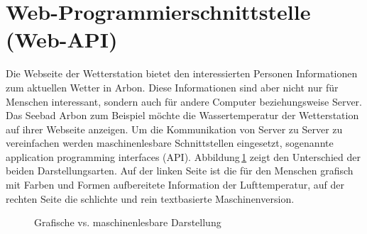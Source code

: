 \section{ Web-Programmierschnittstelle (Web-API)}
Die Webseite der Wetterstation bietet den interessierten Personen Informationen zum aktuellen Wetter in Arbon. Diese Informationen sind aber nicht nur für Menschen interessant, sondern auch für andere Computer beziehungsweise Server. Das Seebad Arbon zum Beispiel möchte die Wassertemperatur der Wetterstation auf ihrer Webseite anzeigen. Um die Kommunikation von Server zu Server zu vereinfachen werden maschinenlesbare Schnittstellen eingesetzt, sogenannte application programming interfaces (API). Abbildung\,\ref{img:humanvsmachine} zeigt den Unterschied der beiden Darstellungsarten. Auf der linken Seite ist die für den Menschen grafisch mit Farben und Formen aufbereitete Information der Lufttemperatur, auf der rechten Seite die schlichte und rein textbasierte Maschinenversion.

\begin{figure}[htbp!]
	\centering
	\caption{Grafische vs. maschinenlesbare Darstellung}
	\label{img:humanvsmachine}
\end{figure}



